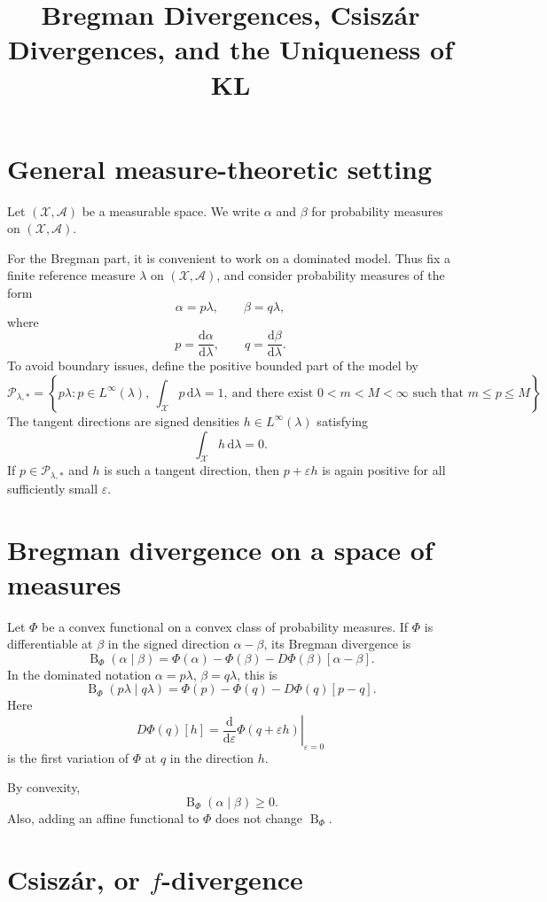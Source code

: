\documentclass[11pt]{article}
\title{Bregman Divergences, Csisz\'ar Divergences, and the Uniqueness of KL}
\author{}
\date{}
\newcommand{\X}{\mathcal X}
\newcommand{\A}{\mathcal A}
\newcommand{\Pcal}{\mathcal P}
\newcommand{\Breg}{\operatorname{B}}
\newcommand{\dd}{\mathrm d}
\newcommand{\1}{\mathbf 1}
\begin{document}
\maketitle

\section{General measure-theoretic setting}

Let \((\X,\A)\) be a measurable space. We write \(\alpha\) and \(\beta\) for
probability measures on \((\X,\A)\).

For the Bregman part, it is convenient to work on a dominated model. Thus fix a
finite reference measure \(\lambda\) on \((\X,\A)\), and consider probability
measures of the form
\[
\alpha=p\lambda,
\qquad
\beta=q\lambda,
\]
where
\[
p=\frac{\dd\alpha}{\dd\lambda},
\qquad
q=\frac{\dd\beta}{\dd\lambda}.
\]
To avoid boundary issues, define the positive bounded part of the model by
\[
\Pcal_{\lambda,*}
=
\left\{
p\lambda:
p\in L^\infty(\lambda),\
\int_\X p\,\dd\lambda=1,\
\text{and there exist }0<m<M<\infty
\text{ such that }m\leq p\leq M
\right\}.
\]
The tangent directions are signed densities \(h\in L^\infty(\lambda)\) satisfying
\[
\int_\X h\,\dd\lambda=0.
\]
If \(p\in\Pcal_{\lambda,*}\) and \(h\) is such a tangent direction, then
\(p+\varepsilon h\) is again positive for all sufficiently small
\(\varepsilon\).

\section{Bregman divergence on a space of measures}

Let \(\Phi\) be a convex functional on a convex class of probability measures. If
\(\Phi\) is differentiable at \(\beta\) in the signed direction
\(\alpha-\beta\), its Bregman divergence is
\[
\Breg_\Phi(\alpha\mid\beta)
=
\Phi(\alpha)-\Phi(\beta)
-
D\Phi(\beta)[\alpha-\beta].
\]
In the dominated notation \(\alpha=p\lambda\), \(\beta=q\lambda\), this is
\[
\Breg_\Phi(p\lambda\mid q\lambda)
=
\Phi(p)-\Phi(q)-D\Phi(q)[p-q].
\]
Here
\[
D\Phi(q)[h]
=
\left.
\frac{\dd}{\dd\varepsilon}
\Phi(q+\varepsilon h)
\right|_{\varepsilon=0}
\]
is the first variation of \(\Phi\) at \(q\) in the direction \(h\).

By convexity,
\[
\Breg_\Phi(\alpha\mid\beta)\geq 0.
\]
Also, adding an affine functional to \(\Phi\) does not change
\(\Breg_\Phi\).

\section{Csisz\'ar, or \(f\)-divergence}
\end{document}
